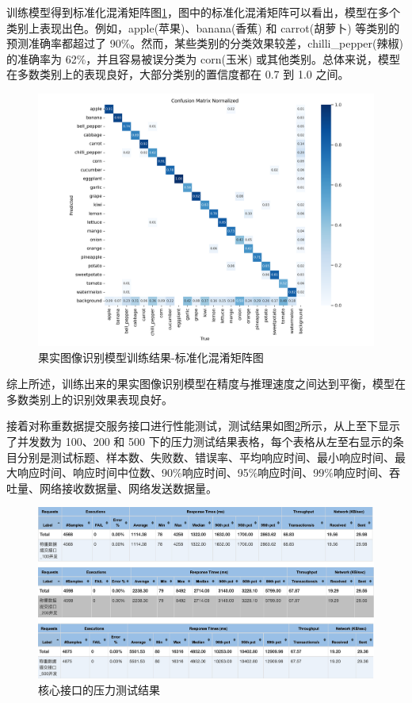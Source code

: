 训练模型得到标准化混淆矩阵图\ref{fig:confusion_matrix_normalized}，图中的标准化混淆矩阵可以看出，模型在多个类别上表现出色。例如，apple(苹果)、banana(香蕉) 和 carrot(胡萝卜) 等类别的预测准确率都超过了 90\%。然而，某些类别的分类效果较差，chilli\_pepper(辣椒)的准确率为 62\%，并且容易被误分类为 corn(玉米) 或其他类别。总体来说，模型在多数类别上的表现良好，大部分类别的置信度都在 0.7 到 1.0 之间。

\begin{figure}
    \centering
    \includegraphics[width=0.95\linewidth]{../source/aws-img/yolov8/out/image/confusion_matrix_normalized.png}
    \caption{果实图像识别模型训练结果-标准化混淆矩阵图}
    \label{fig:confusion_matrix_normalized}
\end{figure}

综上所述，训练出来的果实图像识别模型在精度与推理速度之间达到平衡，模型在多数类别上的识别效果表现良好。

接着对称重数据提交服务接口进行性能测试，测试结果如图\ref{fig:jmeter-test-result}所示，从上至下显示了并发数为 100、200 和 500 下的压力测试结果表格，每个表格从左至右显示的条目分别是测试标题、样本数、失败数、错误率、平均响应时间、最小响应时间、最大响应时间、响应时间中位数、90\%响应时间、95\%响应时间、99\%响应时间、吞吐量、网络接收数据量、网络发送数据量。

\begin{figure}[H]
    \centering
    \includegraphics[width=0.95\linewidth]{../source/aws-test/jmeter-test-result.png}
    \caption{核心接口的压力测试结果}
    \label{fig:jmeter-test-result}
\end{figure}

